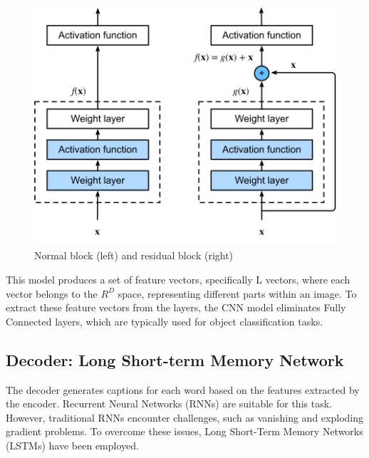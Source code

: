 \documentclass[conference]{IEEEtran}
\begin{document}
\begin{figure}[h]
    \centering
\includegraphics[width=0.9\columnwidth]{assets/residual-block.png}
  \caption{Normal block (left) and residual block (right)}
  \label{fig:residual_block}
\end{figure}


This model produces a set of feature vectors, specifically L vectors, where each vector belongs to the $R^D$ space, representing different parts within an image. To extract these feature vectors from the layers, the CNN model eliminates Fully Connected layers, which are typically used for object classification tasks.




\subsection{Decoder: Long Short-term Memory Network\label{decoder}}

The decoder generates captions for each word based on the features extracted by the encoder. Recurrent Neural Networks (RNNs) are suitable for this task. However, traditional RNNs encounter challenges, such as vanishing and exploding gradient problems. To overcome these issues, Long Short-Term Memory Networks (LSTMs) \cite{hochreiter1997long} have been employed.
\end{document}
